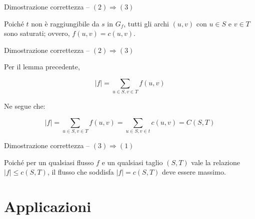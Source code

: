 \begin{frame}{Dimostrazione correttezza -- $(2) \Rightarrow (3)$}


\begin{center}
\end{center}

\small
\BI
\item Poiché $t$ non è raggiungibile da $s$ in $G_f$, tutti gli
archi $(u,v)$ con $u \in S$ e $v \in T$ sono saturati;  ovvero, $f(u,v) = c(u,v)$. 
\EI

\end{frame}

\begin{frame}{Dimostrazione correttezza -- $(2) \Rightarrow (3)$}


\BI
\item Per il lemma precedente,

\[ 
  |f| = \sum_{u \in S, v \in T} f(u,v)
\]
\item Ne segue che:

\[ 
  |f| = \sum_{u \in S, v \in T} f(u,v) = \sum_{u \in S, v \in t} c(u,v) = C(S,T)
\]
\EI

\end{frame}

\begin{frame}{Dimostrazione correttezza -- $(3) \Rightarrow (1)$}


\bigskip
Poiché per un qualsiasi flusso $f$ e un qualsiasi taglio $(S,T)$ vale la relazione $|f| \leq c(S,T)$, 
il flusso che soddisfa $|f| = c(S,T)$ deve essere massimo.

\end{frame}

\section{Applicazioni}

